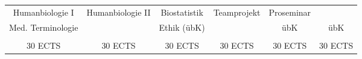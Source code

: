 \begin{table}[htbp]
{\begin{tabular}{|cccccc|}
\multicolumn{1}{|c|}{Humanbiologie I}   & \multicolumn{1}{c|}{Humanbiologie II} & \multicolumn{1}{c|}{Biostatistik}      & \multicolumn{1}{c|}{Teamprojekt}      & \multicolumn{1}{c|}{Proseminar}       &                 \\ \cline{1-1} \cline{3-3} \cline{5-6} 
\multicolumn{1}{|c|}{Med. Terminologie} & \multicolumn{1}{c|}{}                 & \multicolumn{1}{c|}{Ethik (übK)}       & \multicolumn{1}{c|}{}                 & \multicolumn{1}{c|}{übK}              & übK             \\ \hline
\multicolumn{1}{|c|}{}                  & \multicolumn{1}{c|}{}                 & \multicolumn{1}{c|}{}                  & \multicolumn{1}{c|}{}                 & \multicolumn{1}{c|}{}                 &                 \\ \hline
30 ECTS                                 & 30 ECTS                               & 30 ECTS                                & 30 ECTS                               & 30 ECTS                               & 30 ECTS         \\ \hline
\end{tabular}}
\end{table}
